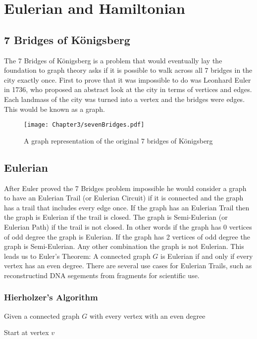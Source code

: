 \chapter{Eulerian and Hamiltonian}
\section{7 Bridges of K\"{o}nigsberg}
The 7 Bridges of K\"{o}nigsberg is a problem that would eventually lay the foundation to graph theory asks if it is possible to walk across all 7 bridges in the city exactly once. First to prove that it was impossible to do was Leonhard Euler in 1736, who proposed an abstract look at the city in terms of vertices and edges. Each landmass of the city was turned into a vertex and the bridges were edges. This would be known as a graph.\cite{7Bridges}
  \begin{figure}[!h]
	\centering
  	\texttt{[image: Chapter3/sevenBridges.pdf]}
	\caption{A graph representation of the original 7 bridges of K\"{o}nigsberg}
  \end{figure}

    \section{Eulerian}
  After Euler proved the 7 Bridges problem impossible he would consider a graph to have an Eulerian Trail (or Eulerian Circuit) if it is connected and the graph has a trail that includes every edge once. If the graph has an Eulerian Trail then the graph is Eulerian if the trail is closed. The graph is Semi-Eulerian (or Eulerian Path) if the trail is not closed. In other words if the graph has 0 vertices of odd degree the graph is Eulerian. If the graph has 2 vertices of odd degree the graph is Semi-Eulerian. Any other combination the graph is not Eulerian. This leads us to Euler's Theorem: A connected graph $G$ is Eulerian if and only if every vertex has an even degree. There are several use cases for Eulerian Trails, such as reconstructind DNA segements from fragments for scientific use.\cite{EulerianAlgos} 

  \subsection{Hierholzer's Algorithm}
  Given a connected graph $G$ with every vertex with an even degree 

  Start at vertex $v$

